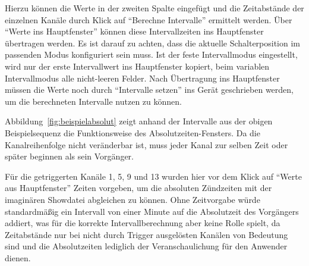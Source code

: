 \documentclass[paper=a4, open=any, numbers=noenddot]{scrbook}
\begin{document}
				Hierzu können die Werte in der zweiten Spalte eingefügt und die Zeitabstände der einzelnen Kanäle durch Klick auf \enquote{Berechne Intervalle} ermittelt werden. Über \enquote{Werte ins Hauptfenster} können diese Intervallzeiten ins Hauptfenster übertragen werden. Es ist darauf zu achten, dass die aktuelle Schalterposition im passenden Modus konfiguriert sein muss. Ist der feste Intervallmodus eingestellt, wird nur der erste Intervallwert ins Hauptfenster kopiert, beim variablen Intervallmodus alle nicht-leeren Felder. Nach Übertragung ins Hauptfenster müssen die Werte noch durch \enquote{Intervalle setzen} ins Gerät geschrieben werden, um die berechneten Intervalle nutzen zu können.

				Abbildung~\ref{fig:beispielabsolut} zeigt anhand der Intervalle aus der obigen Beispielsequenz die Funktionsweise des Absolut\-zeiten-Fensters. Da die Kanalreihenfolge nicht veränderbar ist, muss jeder Kanal zur selben Zeit oder später beginnen als sein Vorgänger.

				Für die getriggerten Kanäle 1, 5, 9 und 13 wurden hier vor dem Klick auf \enquote{Werte aus Hauptfenster} Zeiten vorgeben, um die absoluten Zündzeiten mit der imaginären Showdatei abgleichen zu können. Ohne Zeitvorgabe würde standardmäßig ein Intervall von einer Minute auf die Absolutzeit des Vorgängers addiert, was für die korrekte Intervallberechnung aber keine Rolle spielt, da Zeitabstände nur bei nicht durch Trigger ausgelösten Kanälen von Bedeutung sind und die Absolutzeiten lediglich der Veranschaulichung für den Anwender dienen.
\end{document}
